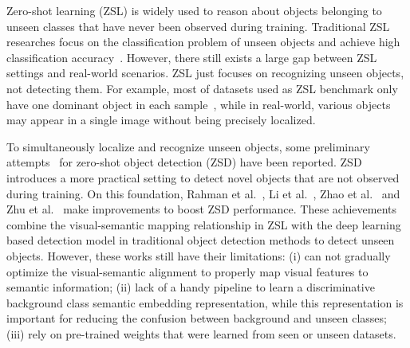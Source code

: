 \documentclass[runningheads]{llncs}
\begin{document}
Zero-shot learning (ZSL) is widely used to reason about objects belonging to unseen classes that have never been observed during training. Traditional ZSL researches focus on the classification problem of unseen objects and achieve high classification accuracy~\cite{zhang2016zero1}. However, there still exists a large gap between ZSL settings and real-world scenarios. ZSL just focuses on recognizing unseen objects, not detecting them. For example, most of datasets used as ZSL benchmark only have one dominant object in each sample~\cite{nilsback2008automated,russakovsky2015imagenet,welinder2010caltech}, while in real-world, various objects may appear in a single image without being precisely localized.

To simultaneously localize and recognize unseen objects, some preliminary attempts~\cite{bansal2018zero,demirel2018zero,rahman2018zero,zhu2019zero} for zero-shot object detection (ZSD) have been reported. ZSD introduces a more practical setting to detect novel objects that are not observed during training. On this foundation, Rahman et al.~\cite{rahman2020improved}, Li et al.~\cite{li2019zero}, Zhao et al.~\cite{zhao2020gtnet} and Zhu et al.~\cite{zhu2020don} make improvements to boost ZSD performance.
These achievements combine the visual-semantic mapping relationship in ZSL with the deep learning based detection model in traditional object detection methods to detect unseen objects. However, these works still have their limitations: (i) can not gradually optimize the visual-semantic alignment to properly map visual features to semantic information; (ii) lack of a handy pipeline to learn a discriminative background class semantic embedding representation, while this representation is important for reducing the confusion between background and unseen classes; (iii) rely on pre-trained weights that were learned from seen or unseen datasets.
\end{document}
